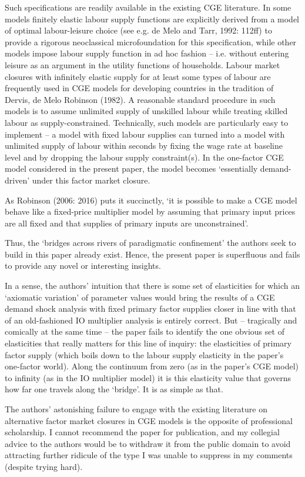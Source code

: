 {Such specifications are readily available in the existing CGE literature. In
some models finitely elastic labour supply functions are explicitly derived
from a model of optimal labour-leisure choice (see e.g. de Melo and Tarr,
1992: 112ff) to provide a rigorous neoclassical microfoundation for this
specification, while other models impose labour supply function in ad hoc
fashion -- i.e. without entering leisure as an argument in the utility
functions of households. Labour market closures with infinitely elastic
supply for at least some types of labour are frequently used in CGE models
for developing countries in the tradition of Dervis, de Melo Robinson
(1982). A reasonable standard procedure in such models is to assume
unlimited supply of unskilled labour while treating skilled labour as
supply-constrained. Technically, such models are particularly easy to
implement -- a model with fixed labour supplies can turned into a model with
unlimited supply of labour within seconds by fixing the wage rate at
baseline level and by dropping the labour supply constraint(s). In the
one-factor CGE model considered in the present paper, the model becomes
`essentially demand-driven' under this factor market closure.

As Robinson (2006: 2016) puts it succinctly, `it is possible to make a CGE
model behave like a fixed-price multiplier model by assuming that primary
input prices are all fixed and that supplies of primary inputs are
unconstrained'.

Thus, the `bridges across rivers of paradigmatic confinement' the authors
seek to build in this paper already exist. Hence, the present paper is
superfluous and fails to provide any novel or interesting insights.

In a sense, the authors' intuition that there is some set of elasticities
for which an `axiomatic variation' of parameter values would bring the
results of a CGE demand shock analysis with fixed primary factor supplies
closer in line with that of an old-fashioned IO multiplier analysis is
entirely correct. But -- tragically and comically at the same time -- the
paper fails to identify the one obvious set of elasticities that really
matters for this line of inquiry: the elasticities of primary factor supply
(which boils down to the labour supply elasticity in the paper's one-factor
world). Along the continuum from zero (as in the paper's CGE model) to
infinity (as in the IO multiplier model) it is this elasticity value that
governs how far one travels along the `bridge'. It is as simple as that.

The authors' astonishing failure to engage with the existing literature on
alternative factor market closures in CGE models is the opposite of
professional scholarship. I cannot recommend the paper for publication, and
my collegial advice to the authors would be to withdraw it from the public
domain to avoid attracting further ridicule of the type I was unable to
suppress in my comments (despite trying hard).}
